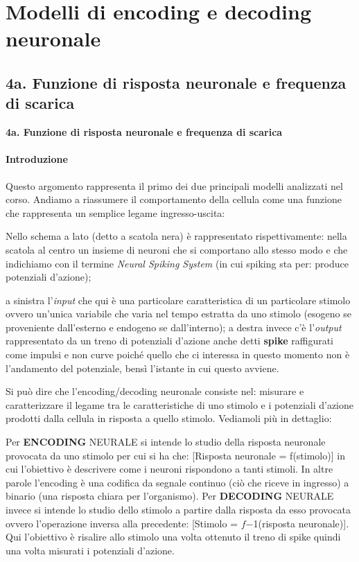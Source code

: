 \documentclass[12pt,a4paper,openany]{book}
\begin{document}
\chapter{Modelli di encoding e decoding neuronale}

\section{4a. Funzione di risposta neuronale e frequenza di scarica}

\textbf{4a. Funzione di risposta neuronale e frequenza di scarica}

\subsubsection{Introduzione}

Questo argomento rappresenta il primo dei due principali modelli analizzati nel corso. Andiamo a riassumere il comportamento della cellula come una funzione che rappresenta un semplice legame ingresso-uscita:

Nello schema a lato (detto a scatola nera) è rappresentato rispettivamente: nella scatola al centro un insieme di neuroni che si comportano allo stesso modo e che indichiamo con il termine \textit{Neural Spiking System }(in cui spiking sta per: produce potenziali d'azione);

a sinistra l'\textit{input }che qui è una particolare caratteristica di un particolare stimolo ovvero un'unica variabile che varia nel tempo estratta da uno stimolo (esogeno se proveniente dall'esterno e endogeno se dall'interno); a destra invece c'è l'\textit{output }rappresentato da un treno di potenziali d'azione anche detti \textbf{spike }raffigurati come impulsi e non curve poiché quello che ci interessa in questo momento non è l'andamento del potenziale, bensì l'istante in cui questo avviene.

Si può dire che l'encoding/decoding neuronale consiste nel: misurare e caratterizzare il legame tra le caratteristiche di uno stimolo e i potenziali d'azione prodotti dalla cellula in risposta a quello stimolo. Vediamoli più in dettaglio:

Per \textbf{ENCODING }NEURALE si intende lo studio della risposta neuronale provocata da uno stimolo per cui si ha che: [Risposta neuronale = f(stimolo)] in cui l'obiettivo è descrivere come i neuroni rispondono a tanti stimoli. In altre parole l'encoding è una codifica da segnale continuo (ciò che riceve in ingresso) a binario (una risposta chiara per l'organismo). Per \textbf{DECODING }NEURALE invece si intende lo studio dello stimolo a partire dalla risposta da esso provocata ovvero l'operazione inversa alla precedente: [Stimolo = $f$$-$1(risposta neuronale)]. Qui l'obiettivo è risalire allo stimolo una volta ottenuto il treno di spike quindi una volta misurati i potenziali d'azione.
\end{document}
